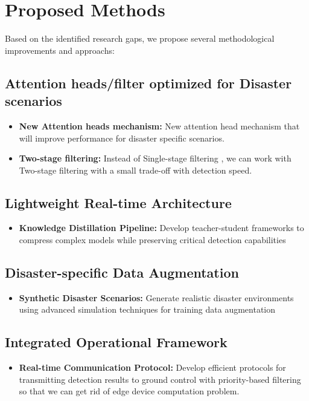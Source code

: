 \documentclass[12pt,a4paper]{report}
\begin{document}
\section{Proposed Methods}

Based on the identified research gaps, we propose several methodological improvements and approachs:

\subsection{  Attention heads/filter optimized for Disaster scenarios}
\begin{itemize}
\item \textbf{New Attention heads mechanism:} New attention head mechanism that will improve performance for disaster specific scenarios.
\item \textbf{Two-stage filtering:} Instead of Single-stage filtering , we can work with Two-stage filtering with a small trade-off with detection speed.
\end{itemize}

\subsection{Lightweight Real-time Architecture}
\begin{itemize}
\item \textbf{Knowledge Distillation Pipeline:} Develop teacher-student frameworks to compress complex models while preserving critical detection capabilities
\end{itemize}

\subsection{Disaster-specific Data Augmentation}
\begin{itemize}
\item \textbf{Synthetic Disaster Scenarios:} Generate realistic disaster environments using advanced simulation techniques for training data augmentation
\end{itemize}

\subsection{Integrated Operational Framework}
\begin{itemize}
\item \textbf{Real-time Communication Protocol:} Develop efficient protocols for transmitting detection results to ground control with priority-based filtering so that we can get rid of edge device computation problem.
\end{itemize}
\end{document}
